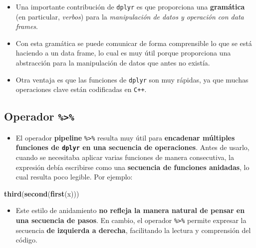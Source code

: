 \documentclass[
]{book}
\newenvironment{Shaded}{\begin{snugshade}}{\end{snugshade}}
\newcommand{\FunctionTok}[1]{\textcolor[rgb]{0.13,0.29,0.53}{\textbf{#1}}}
\newcommand{\NormalTok}[1]{#1}
\providecommand{\tightlist}{%
  \setlength{\itemsep}{0pt}\setlength{\parskip}{0pt}}
\begin{document}
\begin{itemize}
\tightlist
\item
  Una importante contribución de \texttt{dplyr} es que proporciona una \textbf{gramática} (en particular, \emph{verbos}) para la \emph{manipulación de datos y operación con data frames}.\\
\item
  Con esta gramática se puede comunicar de forma comprensible lo que se está haciendo a un data frame, lo cual es muy útil porque proporciona una abstracción para la manipulación de datos que antes no existía.\\
\item
  Otra ventaja es que las funciones de \texttt{dplyr} son muy rápidas, ya que muchas operaciones clave están codificadas en \texttt{C++}.
\end{itemize}

\subsection{\texorpdfstring{Operador \texttt{\%\textgreater{}\%}}{Operador \%\textgreater\%}}\label{operador}

\begin{itemize}
\tightlist
\item
  El operador \textbf{pipeline} \texttt{\%\textgreater{}\%} resulta muy útil para \textbf{encadenar múltiples funciones de \texttt{dplyr} en una secuencia de operaciones}. Antes de usarlo, cuando se necesitaba aplicar varias funciones de manera consecutiva, la expresión debía escribirse como una \textbf{secuencia de funciones anidadas}, lo cual resulta poco legible. Por ejemplo:
\end{itemize}

\begin{Shaded}
\begin{Highlighting}[]
\FunctionTok{third}\NormalTok{(}\FunctionTok{second}\NormalTok{(}\FunctionTok{first}\NormalTok{(x)))}
\end{Highlighting}
\end{Shaded}

\begin{itemize}
\tightlist
\item
  Este estilo de anidamiento \textbf{no refleja la manera natural de pensar en una secuencia de pasos}. En cambio, el operador \texttt{\%\textgreater{}\%} permite expresar la secuencia \textbf{de izquierda a derecha}, facilitando la lectura y comprensión del código.
\end{itemize}
\end{document}
